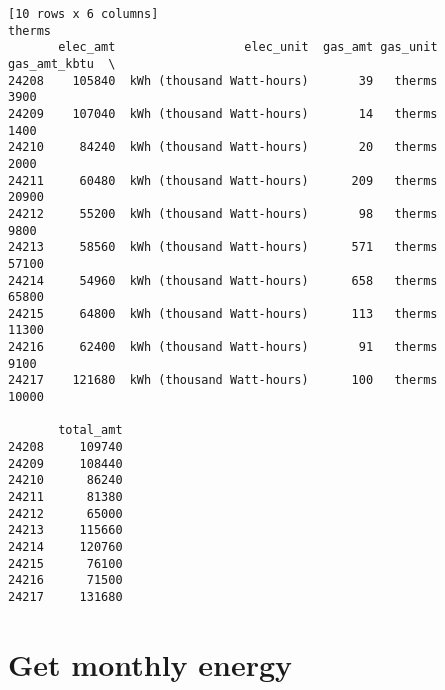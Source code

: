 \documentclass[12pt]{article}
\begin{document}
\begin{verbatim}
[10 rows x 6 columns]
therms
       elec_amt                  elec_unit  gas_amt gas_unit  gas_amt_kbtu  \
24208    105840  kWh (thousand Watt-hours)       39   therms          3900   
24209    107040  kWh (thousand Watt-hours)       14   therms          1400   
24210     84240  kWh (thousand Watt-hours)       20   therms          2000   
24211     60480  kWh (thousand Watt-hours)      209   therms         20900   
24212     55200  kWh (thousand Watt-hours)       98   therms          9800   
24213     58560  kWh (thousand Watt-hours)      571   therms         57100   
24214     54960  kWh (thousand Watt-hours)      658   therms         65800   
24215     64800  kWh (thousand Watt-hours)      113   therms         11300   
24216     62400  kWh (thousand Watt-hours)       91   therms          9100   
24217    121680  kWh (thousand Watt-hours)      100   therms         10000   

       total_amt  
24208     109740  
24209     108440  
24210      86240  
24211      81380  
24212      65000  
24213     115660  
24214     120760  
24215      76100  
24216      71500  
24217     131680 
\end{verbatim}
\section{Get monthly energy}
\end{document}
